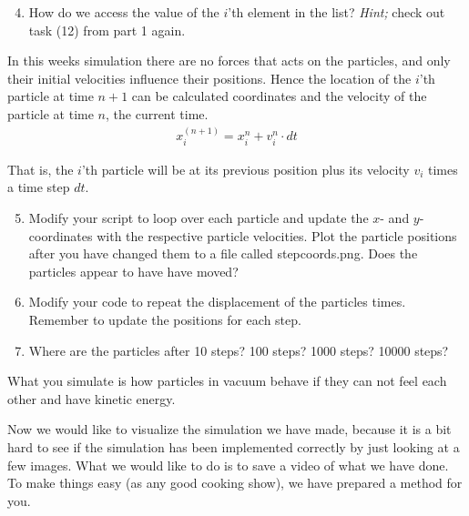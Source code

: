 \documentclass{article}
\begin{document}
\begin{enumerate}
  \setcounter{enumi}{3}
  \item How do we access the value of the $i$'th element in the  list?
      {\em Hint;} check out task (12) from part 1 again.

\end{enumerate}

In this weeks simulation there are no forces that acts on the particles, and only their initial velocities influence their positions.
Hence the location of the $i$'th particle at time $n+1$ can be calculated coordinates and the velocity of the
particle at time $n$, the current time.
\begin{align}
  x_i^{(n+1)} = x^n_i + v_{i}^n \cdot dt
\end{align}

That is, the $i$'th particle will be at its previous position plus its velocity $v_i$ times a time step $dt$.

\begin{enumerate}
  \setcounter{enumi}{4}
  \item
    Modify your script to loop over each particle and update the $x$- and $y$-coordinates with the respective particle velocities.
    Plot the particle positions after you have changed them to a file called stepcoords.png.
    Does the particles appear to have have moved?

  \item Modify your code to repeat the displacement of the particles  times.
      Remember to update the positions for each step.

  \item Where are the particles after 10 steps? 100 steps? 1000 steps? 10000 steps?

\end{enumerate}

What you simulate is how particles in vacuum behave if they can not feel each other and have kinetic energy.\\

\newpage

Now we would like to visualize the simulation we have made, because it is a bit hard to see if the simulation has been implemented correctly by just looking at a few images.
What we would like to do is to save a video of what we have done.
To make things easy (as any good cooking show), we have prepared a method for you.\\
\end{document}
